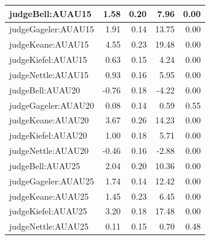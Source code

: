 \documentclass{monashthesis}
\begin{document}
\begin{tabular}{l|r|r|r|r}
\hline
judgeBell:AUAU15 & 1.58 & 0.20 & 7.96 & 0.00\\
\hline
judgeGageler:AUAU15 & 1.91 & 0.14 & 13.75 & 0.00\\
\hline
judgeKeane:AUAU15 & 4.55 & 0.23 & 19.48 & 0.00\\
\hline
judgeKiefel:AUAU15 & 0.63 & 0.15 & 4.24 & 0.00\\
\hline
judgeNettle:AUAU15 & 0.93 & 0.16 & 5.95 & 0.00\\
\hline
judgeBell:AUAU20 & -0.76 & 0.18 & -4.22 & 0.00\\
\hline
judgeGageler:AUAU20 & 0.08 & 0.14 & 0.59 & 0.55\\
\hline
judgeKeane:AUAU20 & 3.67 & 0.26 & 14.23 & 0.00\\
\hline
judgeKiefel:AUAU20 & 1.00 & 0.18 & 5.71 & 0.00\\
\hline
judgeNettle:AUAU20 & -0.46 & 0.16 & -2.88 & 0.00\\
\hline
judgeBell:AUAU25 & 2.04 & 0.20 & 10.36 & 0.00\\
\hline
judgeGageler:AUAU25 & 1.74 & 0.14 & 12.42 & 0.00\\
\hline
judgeKeane:AUAU25 & 1.45 & 0.23 & 6.45 & 0.00\\
\hline
judgeKiefel:AUAU25 & 3.20 & 0.18 & 17.48 & 0.00\\
\hline
judgeNettle:AUAU25 & 0.11 & 0.15 & 0.70 & 0.48\\
\hline
\end{tabular}
\end{document}
